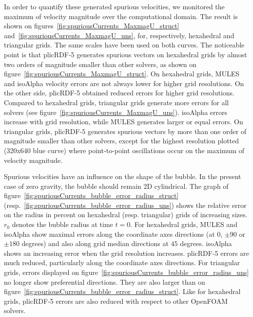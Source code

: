 \documentclass[review]{elsarticle}
\begin{document}
In order to quantify these generated spurious velocities, we monitored the maximum of velocity magnitude over the computational domain. The result is shown on figures~\ref{fig:spuriousCurrents_MaxmagU_struct} and~\ref{fig:spuriousCurrents_MaxmagU_uns}, for, respectively, hexahedral and triangular grids. The same scales have been used on both curves. The noticeable point is that plicRDF-5 generates spurious vectors on hexahedral grids by almost two orders of magnitude smaller than other solvers, as shown on figure~\ref{fig:spuriousCurrents_MaxmagU_struct}. On hexahedral grids, MULES and isoAlpha velocity errors are not always lower for higher grid resolutions. On the other side, plicRDF-5 obtained reduced errors for higher grid resolutions. Compared to hexahedral grids, triangular grids generate more errors for all solvers (see figure~\ref{fig:spuriousCurrents_MaxmagU_uns}). isoAlpha errors increase with grid resolution, while MULES generates larger or equal errors. On triangular grids, plicRDF-5 generates spurious vectors by more than one order of magnitude smaller than other solvers, except for the highest resolution plotted (320x640 blue curve) where point-to-point oscillations occur on the maximum of velocity magnitude. 

Spurious velocities have an influence on the shape of the bubble. In the present case of zero gravity, the bubble should remain 2D cylindrical. The graph of figure~\ref{fig:spuriousCurrents_bubble_error_radius_struct} (resp.~\ref{fig:spuriousCurrents_bubble_error_radius_uns}) shows the relative error on the radius in percent on hexahedral (resp. triangular) grids of increasing sizes. $r_0$ denotes the bubble radius at time $t=0$. For hexahedral grids, MULES and isoAlpha show maximal errors along the coordinate axes directions (at $0$, $\pm 90$ or $\pm 180$ degrees) and also along grid median directions at $45$ degrees. isoAlpha shows an increasing error when the grid resolution increases. plicRDF-5 errors are much reduced, particularly along the coordinate axes directions. For triangular grids, errors displayed on figure~\ref{fig:spuriousCurrents_bubble_error_radius_uns} no longer show preferential directions. They are also larger than on figure~\ref{fig:spuriousCurrents_bubble_error_radius_struct}. Like for hexahedral grids, plicRDF-5 errors are also reduced with respect to other OpenFOAM solvers. 
\end{document}
